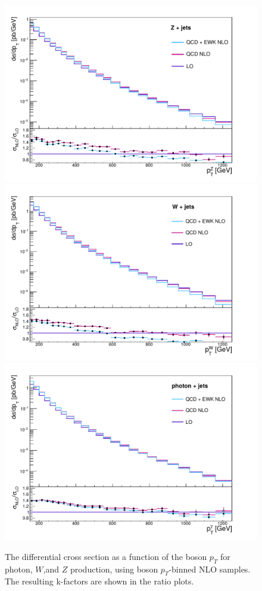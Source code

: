 \begin{figure}[ht]
  \centering
 \includegraphics[width=.49\textwidth]{Z_EWK_kfactor.pdf} 
 \includegraphics[width=.49\textwidth]{W_EWK_kfactor.pdf} \\
 \includegraphics[width=.49\textwidth]{gamma_EWK_kfactor.pdf} 
 \caption{The differential cross section as a function of the boson $p_T$ for photon, $W$,and $Z$ production, using boson $p_T$-binned \ac{NLO} samples. The resulting k-factors are shown in the ratio plots.}
 \label{fig:kfactors}
\end{figure}

